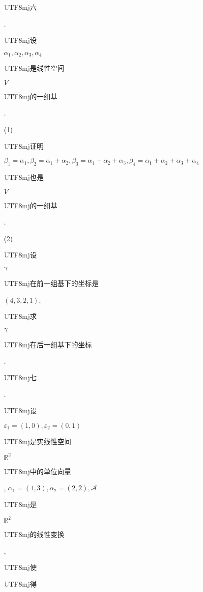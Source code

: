 \documentclass[10pt]{article}
\begin{document}
\begin{CJK}{UTF8}{mj}六\end{CJK}. \begin{CJK}{UTF8}{mj}设\end{CJK} $\alpha_{1}, \alpha_{2}, \alpha_{3}, \alpha_{4}$ \begin{CJK}{UTF8}{mj}是线性空间\end{CJK} $V$ \begin{CJK}{UTF8}{mj}的一组基\end{CJK}.

(1) \begin{CJK}{UTF8}{mj}证明\end{CJK} $\beta_{1}=\alpha_{1}, \beta_{2}=\alpha_{1}+\alpha_{2}, \beta_{3}=\alpha_{1}+\alpha_{2}+\alpha_{3}, \beta_{4}=\alpha_{1}+\alpha_{2}+\alpha_{3}+\alpha_{4}$ \begin{CJK}{UTF8}{mj}也是\end{CJK} $V$ \begin{CJK}{UTF8}{mj}的一组基\end{CJK}.

(2) \begin{CJK}{UTF8}{mj}设\end{CJK} $\gamma$ \begin{CJK}{UTF8}{mj}在前一组基下的坐标是\end{CJK} $(4,3,2,1)$, \begin{CJK}{UTF8}{mj}求\end{CJK} $\gamma$ \begin{CJK}{UTF8}{mj}在后一组基下的坐标\end{CJK}.

\begin{CJK}{UTF8}{mj}七\end{CJK}. \begin{CJK}{UTF8}{mj}设\end{CJK} $\varepsilon_{1}=(1,0), \varepsilon_{2}=(0,1)$ \begin{CJK}{UTF8}{mj}是实线性空间\end{CJK} $\mathbb{R}^{2}$ \begin{CJK}{UTF8}{mj}中的单位向量\end{CJK}, $\alpha_{1}=(1,3), \alpha_{2}=(2,2), \mathscr{A}$ \begin{CJK}{UTF8}{mj}是\end{CJK} $\mathbb{R}^{2}$ \begin{CJK}{UTF8}{mj}的线性变换\end{CJK}, \begin{CJK}{UTF8}{mj}使\end{CJK} \begin{CJK}{UTF8}{mj}得\end{CJK}
\end{document}

